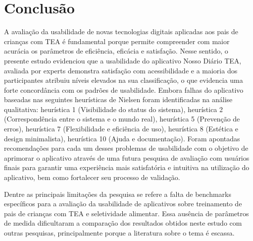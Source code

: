 \documentclass[portuguese]{textolivre}
\begin{document}
\section{Conclusão}\label{sec-resumo}
A avaliação da usabilidade de novas tecnologias digitais aplicadas aos pais de crianças com TEA é fundamental porque permite compreender com maior acurácia os parâmetros de eficiência, eficácia e satisfação. Nesse sentido, o presente estudo evidenciou que a usabilidade do aplicativo Nosso Diário TEA, avaliada por experts demonstra satisfação com acessibilidade e a maioria dos participantes atribuiu níveis elevados na sua classificação, o que evidencia uma forte concordância com os padrões de usabilidade. Embora falhas do aplicativo baseadas nas seguintes heurísticas de Nielsen foram identificadas na análise qualitativa: heurística 1 (Visibilidade do status do sistema), heurística 2 (Correspondência entre o sistema e o mundo real), heurística 5 (Prevenção de erros), heurística 7 (Flexibilidade e eficiência de uso), heurística 8 (Estética e design minimalista), heurística 10 (Ajuda e documentação). Foram apontadas recomendações para cada um desses problemas de usabilidade com o objetivo de aprimorar o aplicativo através de uma futura pesquisa de avaliação com usuários finais para garantir uma experiência mais satisfatória e intuitiva na utilização do aplicativo, bem como fortalecer seu processo de validação.

Dentre as principais limitações da pesquisa se refere a falta de benchmarks específicos para a avaliação da usabilidade de aplicativos sobre treinamento de pais de crianças com TEA e seletividade alimentar. Essa ausência de parâmetros de medida dificultaram a comparação dos resultados obtidos neste estudo com outras pesquisas, principalmente porque a literatura sobre o tema é escassa.
\end{document}
